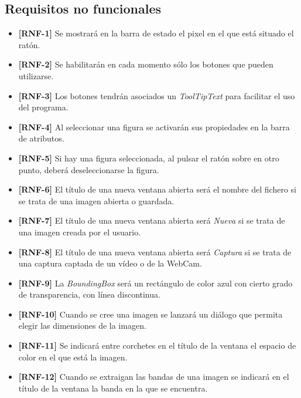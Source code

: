 \subsection{Requisitos no funcionales}
\begin{itemize}
\item{\textbf{[RNF-1]} Se mostrará en la barra de estado el pixel en el que está situado el ratón.}
\item{\textbf{[RNF-2]} Se habilitarán en cada momento sólo los botones que pueden utilizarse.}
\item{\textbf{[RNF-3]} Los botones tendrán asociados un \textit{ToolTipText} para facilitar el uso del programa.}
\item{\textbf{[RNF-4]} Al seleccionar una figura se activarán sus propiedades en la barra de atributos.}
\item{\textbf{[RNF-5]} Si hay una figura seleccionada, al pulsar el ratón sobre en otro punto, deberá deseleccionarse la figura.}
\item{\textbf{[RNF-6]} El título de una nueva ventana abierta será el nombre del fichero si se trata de una imagen abierta o guardada.}
\item{\textbf{[RNF-7]} El título de una nueva ventana abierta será \textit{Nueva} si se trata de una imagen creada por el usuario.}
\item{\textbf{[RNF-8]} El título de una nueva ventana abierta será \textit{Captura} si se trata de una captura captada de un vídeo o de la WebCam.}
\item{\textbf{[RNF-9]} La \textit{BoundingBox} será un rectángulo de color azul con cierto grado de transparencia, con línea discontinua.}
\item{\textbf{[RNF-10]} Cuando se cree una imagen se lanzará un diálogo que permita elegir las dimensiones de la imagen.}
\item{\textbf{[RNF-11]} Se indicará entre corchetes en el título de la ventana el espacio de color en el que está la imagen.}
\item{\textbf{[RNF-12]} Cuando se extraigan las bandas de una imagen se indicará en el título de la ventana la banda en la que se encuentra.}
\end{itemize}

\clearpage

